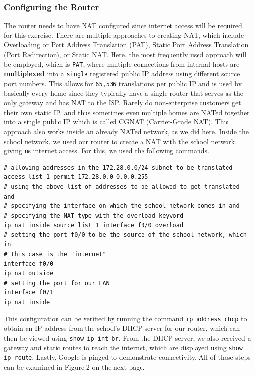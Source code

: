 \documentclass[a4paper]{article}
\begin{document}
\subsubsection{Configuring the Router}
The router needs to have NAT configured since internet access will be required for this exercise. \nl
There are multiple approaches to creating NAT, which include Overloading or Port Address Translation (PAT), Static Port Address Translation (Port Redirection), or Static NAT.\cite{noauthor_how_nodate} \nl
Here, the most frequently used approach will be employed, which is \texttt{PAT}, where multiple connections from internal hosts are \textbf{multiplexed} into a \texttt{single} registered public IP address using different source port numbers. This allows for \texttt{65,536} translations per public IP and is used by basically every home since they typically have a single router that serves as the only gateway and has NAT to the ISP. Rarely do non-enterprise customers get their own static IP, and thus sometimes even multiple homes are NATed together into a single public IP which is called CGNAT (Carrier-Grade NAT).\cite{noauthor_how_nodate, noauthor_what_nodate-1} \nl
This approach also works inside an already NATed network, as we did here. Inside the school network, we used our router to create a NAT with the school network, giving us internet access. For this, we used the following commands.
\begin{listing}[ht]
\begin{verbatim}
# allowing addresses in the 172.28.0.0/24 subnet to be translated
access-list 1 permit 172.28.0.0 0.0.0.255
# using the above list of addresses to be allowed to get translated and 
# specifying the interface on which the school network comes in and 
# specifying the NAT type with the overload keyword
ip nat inside source list 1 interface f0/0 overload
# setting the port f0/0 to be the source of the school network, which in 
# this case is the "internet"
interface f0/0
ip nat outside
# setting the port for our LAN
interface f0/1
ip nat inside
\end{verbatim}
\caption{Router NAT configuration commands}
\end{listing} \nl
This configuration can be verified by running the command \texttt{ip address dhcp} to obtain an IP address from the school's DHCP server for our router, which can then be viewed using \texttt{show ip int br}. From the DHCP server, we also received a gateway and static routes to reach the internet, which are displayed using \texttt{show ip route}. Lastly, Google is pinged to demonstrate connectivity. All of these steps can be examined in Figure 2 on the next page. \newpage
\end{document}
